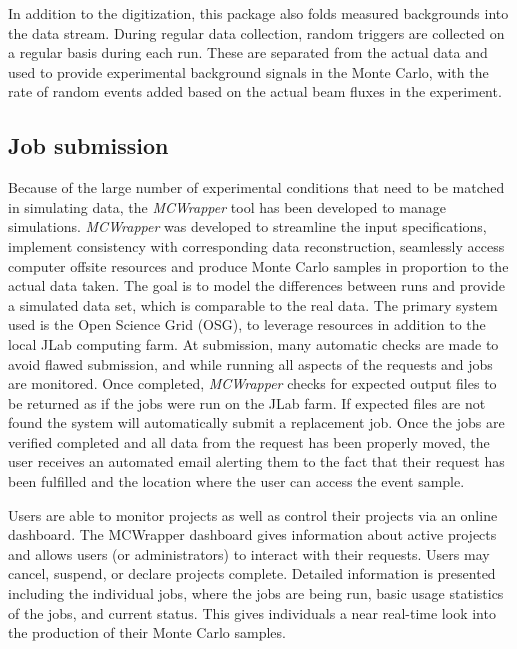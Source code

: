 In addition to the digitization, this package also folds measured backgrounds into the data stream. During regular data collection, random triggers are collected on a regular basis during each run. These are separated from the actual data and used to provide experimental background signals in the Monte Carlo, with the rate of random events added based on the actual beam fluxes in the experiment. 

\subsection{Job submission \label{sec:jobsubmission}}
Because of the large number of experimental conditions that need to be matched in simulating data, the \emph{MCWrapper} tool has been developed to manage simulations. \emph{MCWrapper} was developed to streamline the input specifications, implement consistency with corresponding data reconstruction, seamlessly access computer offsite resources and produce Monte Carlo samples in proportion to the actual data taken. The goal is to model the differences between runs and provide a simulated data set, which is comparable to the real data. The primary system used is the Open Science Grid (OSG), to leverage resources in addition to the local JLab computing farm. At submission, many automatic checks are made to avoid flawed submission, and while running all aspects of the requests and jobs are monitored. Once completed, \emph{MCWrapper} checks for expected output files to be returned as if the jobs were run on the JLab farm. If expected files are not found the system will automatically submit a replacement job. Once the jobs are verified completed and all data from the request has been properly moved, the user receives an automated email alerting them to the fact that their request has been fulfilled and the location where the user can access the event sample.

Users are able to monitor projects as well as control their projects via an online dashboard. The MCWrapper dashboard gives information about active projects and allows users (or administrators) to interact with their requests. Users may cancel, suspend, or declare projects complete. Detailed information is presented including the individual jobs, where the jobs are being run, basic usage statistics of the jobs, and current status.  This gives individuals a near real-time look into the production of their Monte Carlo samples.




